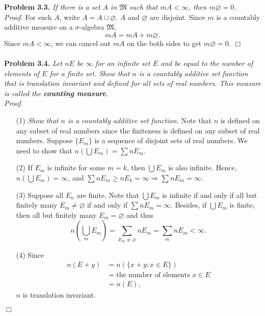 \documentclass{article}
\begin{document}



\textbf{Problem 3.3.}
\emph{If there is a set $A$ in $\mathfrak{M}$ such that $mA < \infty$,
then $m\varnothing = 0$.} \\



\emph{Proof.}
For such $A$, write $A = A \cup \varnothing$.
$A$ and $\varnothing$ are disjoint.
Since $m$ is a countably additive measure
on a $\sigma$-algebra $\mathfrak{M}$,
\[
  mA = mA + m\varnothing.
\]
Since $mA < \infty$,
we can cancel out $mA$ on the both sides to get
$m\varnothing = 0$.
$\Box$ \\\\






\textbf{Problem 3.4.}
\emph{Let $nE$ be $\infty$ for an infinite set $E$ and
be equal to the number of elements of $E$ for a finite set.
Show that $n$ is a countably additive set function that is translation invariant and
defined for all sets of real numbers.
This measure is called the \textbf{counting measure}.} \\



\emph{Proof.}
\begin{enumerate}
\item[(1)]
  \emph{Show that $n$ is a countably additive set function.}
  Note that $n$ is defined on any subset of real numbers
  since the finiteness is defined on any subset of real numbers.
  Suppose $\{ E_m \}$ is a sequence of disjoint sets of real numbers.
  We need to show that $n\left( \bigcup E_m \right) = \sum n E_m$.

\item[(2)]
  If $E_m$ is infinite for some $m = k$, then $\bigcup E_m$ is also infinite.
  Hence, $n \left( \bigcup E_m \right) = \infty$,
  and $\sum n E_m \geq n E_k = \infty \Longrightarrow \sum n E_m = \infty$.

\item[(3)]
  Suppose all $E_n$ are finite.
  Note that
  $\bigcup E_m$ is infinite if and only if all but finitely many $E_m \neq \varnothing$
  if and only if $\sum n E_m = \infty$.
  Besides, if $\bigcup E_m$ is finite, then all but finitely many $E_m = \varnothing$
  and thus
  \[
    n\left( \bigcup_m E_m \right)
    = \sum_{E_m \neq \varnothing} n E_m
    = \sum_{m} n E_m
    < \infty.
  \]

\item[(4)]
  Since
  \begin{align*}
    n(E+y)
    &= n(\{ x + y : x \in E\}) \\
    &= \text{the number of elements $x \in E$} \\
    &= n(E),
  \end{align*}
  $n$ is translation invariant.
\end{enumerate}
$\Box$ \\\\
\end{document}
